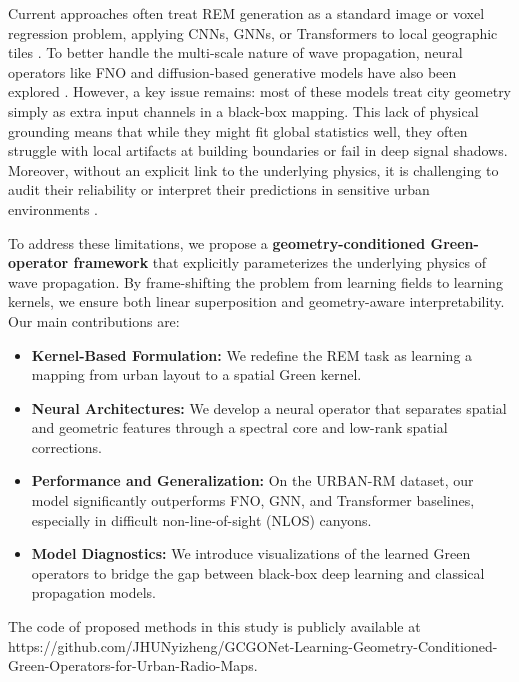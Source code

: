 \documentclass{article}
\begin{document}
Current approaches often treat REM generation as a standard image or voxel regression problem, applying CNNs, GNNs, or Transformers to local geographic tiles \cite{levie2021radiounet,chen2023gnnrem,fang2025radioformer}. To better handle the multi-scale nature of wave propagation, neural operators like FNO and diffusion-based generative models have also been explored \cite{li2020fourier,zhang2024spectrumnet,Liu_2025_CVPR}. However, a key issue remains: most of these models treat city geometry simply as extra input channels in a black-box mapping. This lack of physical grounding means that while they might fit global statistics well, they often struggle with local artifacts at building boundaries or fail in deep signal shadows. Moreover, without an explicit link to the underlying physics, it is challenging to audit their reliability or interpret their predictions in sensitive urban environments \cite{amini2020deep,feng2025survey}.



To address these limitations, we propose a \textbf{geometry-conditioned Green-operator framework} that explicitly parameterizes the underlying physics of wave propagation. By frame-shifting the problem from learning fields to learning kernels, we ensure both linear superposition and geometry-aware interpretability. Our main contributions are:
\begin{itemize}[leftmargin=1.5em, itemsep=0.1em]
    \item \textbf{Kernel-Based Formulation:} We redefine the REM task as learning a mapping from urban layout to a spatial Green kernel.
    \item \textbf{Neural Architectures:} We develop a neural operator that separates spatial and geometric features through a spectral core and low-rank spatial corrections.
    \item \textbf{Performance and Generalization:} On the URBAN-RM dataset, our model significantly outperforms FNO, GNN, and Transformer baselines, especially in difficult non-line-of-sight (NLOS) canyons.
    \item \textbf{Model Diagnostics:} We introduce visualizations of the learned Green operators to bridge the gap between black-box deep learning and classical propagation models.
\end{itemize}

The code of proposed methods in this study is publicly available at https://github.com/JHUNyizheng/GCGONet-Learning-Geometry-Conditioned-Green-Operators-for-Urban-Radio-Maps.
\end{document}

